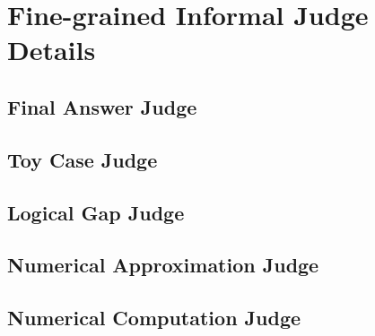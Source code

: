 




\clearpage
\section{Fine-grained Informal Judge Details}
\label{app:evaluation_details}

\subsection{Final Answer Judge}
\label{app:answer_judge_appendix}





\subsection{Toy Case Judge}
\label{app:toy_case_appendix}






\subsection{Logical Gap Judge}
\label{app:logical_gap_appendix}





\subsection{Numerical Approximation Judge}
\label{app:approximation_judge_appendix}




\subsection{Numerical Computation Judge}
\label{app:computation_judge_appendix}





